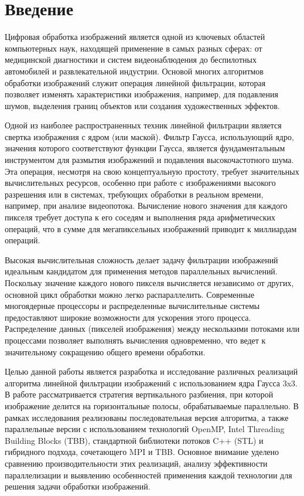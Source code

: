 \documentclass[12pt,a4paper]{extarticle}
\begin{document}
	\newpage

\tableofcontents
\newpage

\section{Введение}
Цифровая обработка изображений является одной из ключевых областей компьютерных наук, находящей применение в самых разных сферах: от медицинской диагностики и систем видеонаблюдения до беспилотных автомобилей и развлекательной индустрии. Основой многих алгоритмов обработки изображений служит операция линейной фильтрации, которая позволяет изменять характеристики изображения, например, для подавления шумов, выделения границ объектов или создания художественных эффектов.

Одной из наиболее распространенных техник линейной фильтрации является свертка изображения с ядром (или маской). Фильтр Гаусса, использующий ядро, значения которого соответствуют функции Гаусса, является фундаментальным инструментом для размытия изображений и подавления высокочастотного шума. Эта операция, несмотря на свою концептуальную простоту, требует значительных вычислительных ресурсов, особенно при работе с изображениями высокого разрешения или в системах, требующих обработки в реальном времени, например, при анализе видеопотока. Вычисление нового значения для каждого пикселя требует доступа к его соседям и выполнения ряда арифметических операций, что в сумме для мегапиксельных изображений приводит к миллиардам операций.

Высокая вычислительная сложность делает задачу фильтрации изображений идеальным кандидатом для применения методов параллельных вычислений. Поскольку значение каждого нового пикселя вычисляется независимо от других, основной цикл обработки можно легко распараллелить. Современные многоядерные процессоры и распределенные вычислительные системы предоставляют широкие возможности для ускорения этого процесса. Распределение данных (пикселей изображения) между несколькими потоками или процессами позволяет выполнять вычисления одновременно, что ведет к значительному сокращению общего времени обработки.

Целью данной работы является разработка и исследование различных реализаций алгоритма линейной фильтрации изображений с использованием ядра Гаусса 3x3. В работе рассматривается стратегия вертикального разбиения, при которой изображение делится на горизонтальные полосы, обрабатываемые параллельно. В рамках исследования реализованы последовательная версия алгоритма, а также параллельные версии с использованием технологий OpenMP, Intel Threading Building Blocks (TBB), стандартной библиотеки потоков C++ (STL) и гибридного подхода, сочетающего MPI и TBB. Основное внимание уделено сравнению производительности этих реализаций, анализу эффективности параллелизации и выявлению особенностей применения каждой технологии для решения задачи обработки изображений.
\end{document}
